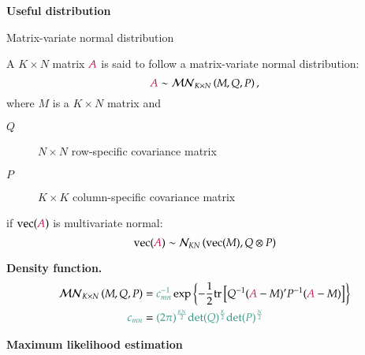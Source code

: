 \documentclass[notes,blackandwhite,mathsans,usenames,dvipsnames]{beamer}
\begin{document}
{
\begin{frame}

\begin{adjustwidth}{-0.5cm}{0cm}
\vspace{8.3cm}\Large
\textbf{{\color{mcxs1}Useful} {\color{mcxs2}distribution}}
\end{adjustwidth}

\end{frame}
}






\begin{frame}{Matrix-variate normal distribution}

{\color{mcxs2}A} $K\times N$ {\color{mcxs2}matrix} ${\color{purple}A}$ {\color{mcxs2}is said to follow a} {\color{mcxs1}matrix-variate normal} {\color{mcxs2}distribution:}
$$ {\color{purple}A} \sim \mathcal{MN}_{K\times N}\left( M, Q, P \right), $$ 
{\color{mcxs2}where} $M$ {\color{mcxs2}is a} $K\times N$  {\color{mcxs2}matrix and} 
\begin{description}
\item[$Q$] $N\times N$ {\color{mcxs2}row-specific covariance matrix} 
\item[$P$] $K\times K$ {\color{mcxs2}column-specific covariance matrix}
\end{description}
{\color{mcxs2}if} $\text{vec}({\color{purple}A})$ {\color{mcxs2}is multivariate normal:}
$$ \text{vec}({\color{purple}A}) \sim \mathcal{N}_{KN}\left( \text{vec}(M), Q\otimes P \right) $$ 

\bigskip
\textbf{Density function.}  
\begin{align*}
\mathcal{MN}_{K\times N}\left( M, Q, P \right) &= {\color{mcxs2}c_{mn}^{-1}}\exp\left\{ -\frac{1}{2}\text{tr}\left[ Q^{-1}({\color{purple}A}-M)'P^{-1}({\color{purple}A}-M) \right] \right\}\\
{\color{mcxs2}c_{mn}} &= {\color{mcxs2}(2\pi)^{\frac{KN}{2}}\text{det}(Q)^{\frac{K}{2}}\text{det}(P)^{\frac{N}{2}} }
\end{align*}
\end{frame}






{
\begin{frame}

\begin{adjustwidth}{-0.5cm}{0cm}
\vspace{8.3cm}\Large
\textbf{{\color{mcxs1}Maximum likelihood} {\color{mcxs2}estimation}}
\end{adjustwidth}

\end{frame}
}
\end{document}
